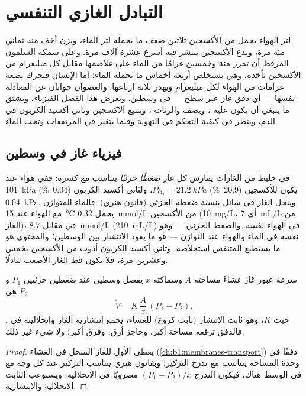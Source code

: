 \chapter{التبادل الغازي التنفسي}\label{ch:b1:gas-exchange}

لتر الهواء يحمل من الأكسجين ثلاثين ضعف ما يحمله لتر الماء، ويزن
أخف منه ثماني مئة مرة، ويدع الأكسجين ينتشر فيه أسرع عشرة آلاف مرة.
وعلى سمكة السلمون المرقط أن تمرر مئة وخمسين غرامًا من الماء على
غلاصمها مقابل كل ميليغرام من الأكسجين تأخذه، وهي تستخلص أربعة
أخماس ما يحمله الماء؛ أما الإنسان فيحرك بضعة غرامات من الهواء لكل
ميليغرام ويهدر ثلاثة أرباعها. والعضوان جوابان عن المعادلة نفسها ---
أي دفق غاز عبر سطح --- في وسطين. ويعرض هذا الفصل الفيزياء، ويشتق
ما ينبغي أن يكون عليه ، ويصف  والرئات ، ويتتبع الأكسجين وثاني أكسيد الكربون في الدم، وينظر في
كيفية التحكم في التهوية وفيما يتغير في المرتفعات وتحت الماء.

\section{فيزياء غاز في وسطين}

\begin{definition}\label{def:b1:gas-exchange:partial}
في خليط من الغازات يمارس كل غاز \emph{ضغطًا جزئيًا} يتناسب مع
كسره: ففي هواء عند \qty{101}{kPa} يكون للأكسجين
(\qty{20.9}{\%}) $P_{\mathrm{O_2}} = \qty{21.2}{kPa}$، ولثاني
أكسيد الكربون (\qty{0.04}{\%}) \qty{0.04}{kPa}. وينحل الغاز في
سائل بنسبة ضغطه الجزئي (قانون هنري): فالماء المتوازن مع الهواء عند
\qty{15}{\celsius} يحمل \qty{0.32}{mmol/L} من الأكسجين
(\qty{10}{mg/L}، أي \qty{7}{mL/L} من الغاز)، في مقابل
\qty{8.7}{mmol/L} (\qty{210}{mL/L}) في الهواء نفسه. والضغط الجزئي
--- وهو نفسه في الماء والهواء عند التوازن --- هو ما يقود الانتشار
بين الوسطين؛ والمحتوى هو ما يستطيع المتنفس استخلاصه. وثاني أكسيد
الكربون أذوب من الأكسجين بخمس وعشرين مرة، فلا يكون قط الغاز الأصعب
تبادلًا.
\end{definition}

\begin{theorem}\label{thm:b1:gas-exchange:fick}
سرعة عبور غاز غشاءً مساحته $A$ وسماكته $x$ يفصل وسطين عند ضغطين
جزئيين $P_1$ و$P_2$ هي
\[
\dot V = K\,\frac{A}{x}\,(P_1 - P_2),
\]
حيث $K$، وهو ثابت الانتشار (ثابت كروغ) للغشاء، يجمع انتشارية الغاز
وانحلاليته في . فالدفق ترفعه مساحة أكبر، وحاجز أرق، وفرق
 أكبر؛ ولا شيء غير ذلك.
\end{theorem}
\begin{proof}
يعطي  الأول للغاز المنحل في الغشاء
(\cref{ch:b1:membranes-transport}) دفقًا في وحدة المساحة يتناسب مع
تدرج التركيز؛ وبقانون هنري يتناسب التركيز عند كل وجه مع  في الوسط هناك، فيكون التدرج $(P_1 - P_2)/x$ مضروبًا في
الانحلالية، ويستوعب الثابت الانحلالية والانتشارية.
\end{proof}

